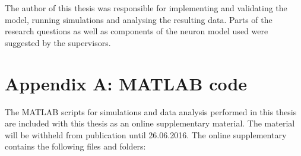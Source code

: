 \documentclass[a4paper,12pt]{report}
\theoremstyle{definition}
\begin{document}
The author of this thesis was responsible for implementing and validating the model, running simulations and analysing the resulting data. Parts of the research questions as well as components of the neuron model used were suggested by the supervisors.




\newpage






\chapter*{Appendix A: MATLAB code}
\label{appendix:code}

The MATLAB scripts for simulations and data analysis performed in this thesis are included with this thesis as an online supplementary material. The material will be withheld from publication until 26.06.2016. The online supplementary contains the following files and folders:
\end{document}
